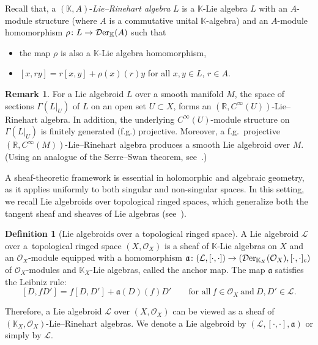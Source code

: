 \documentclass[pdftex]{sigma}
\numberwithin{equation}{section}
\theoremstyle{definition}
\newtheorem{Def}[Thm]{Definition}
\newtheorem{Rem}[Thm]{Remark}
\begin{document}
Recall that, a $(\mathbb{K}, A)$-\emph{Lie--Rinehart algebra} $L$ is a $\mathbb{K}$-Lie algebra $L$ with an $A$-module structure (where $A$ is a commutative unital $\mathbb{K}$-algebra) and an $A$-module homomorphism $\rho\colon L\rightarrow \mathcal{D}{\rm er}_{\mathbb{K}}(A)$ such that
\begin{itemize}\itemsep=0pt
	\item the map $\rho$ is also a $\mathbb{K}$-Lie algebra homomorphism,
	\item $ [x, ry]=r[x,y]+\rho(x)(r)y$ for all $x,y\in L$, $r\in A$.
\end{itemize}

\begin{Rem}
	For a Lie algebroid $L$ over a smooth manifold $M$, the space of sections $\Gamma(L|_U)$ of $L$ on an open set $U \subset X$, forms an $(\mathbb{R}, C^{\infty}(U))$-Lie--Rinehart algebra. In addition, the underlying $C^{\infty}(U)$-module structure on $\Gamma(L|_U)$ is finitely generated $($f.g.$)$ projective. Moreover, a f.g.\ projective $(\mathbb{R}, C^{\infty}(M))$-Lie--Rinehart algebra produces a smooth Lie algebroid over $M$.
(Using an analogue of the Serre--Swan theorem, see~\cite{JN}.)
\end{Rem}
A sheaf-theoretic framework is essential in holomorphic and algebraic geometry, as it applies uniformly to both singular and non-singular spaces.
In this setting, we recall Lie algebroids over topological ringed spaces, which generalize both the tangent sheaf and sheaves of Lie algebras (see~\cite{AA, JV}).

\begin{Def}[Lie algebroids over a topological ringed space] \label{Lie algebroids}
	A Lie algebroid $\mathcal{L}$ over a~topological ringed space $(X,\mathcal{O}_X)$ is a sheaf of $\mathbb{K}$-Lie algebras on $X$ and an $\mathcal{O}_X$-module equipped with a homomorphism $\mathfrak{a}\colon (\mathcal{L},[\cdot,\cdot])\rightarrow (\mathcal{D}{\rm er}_{\mathbb{K}_X}(\mathcal{O}_X),[\cdot,\cdot]_c)$ of $\mathcal{O}_X$-modules and $\mathbb{K}_X$-Lie algebras, called the anchor map. The map $\mathfrak{a}$ satisfies the Leibniz rule:
\[
[D,f D'] = f[D,D']+\mathfrak{a}(D)(f) D'\qquad \text{for all} \ f \in \mathcal{O}_X \ \text{and}
\ D,D' \in \mathcal{L}.
\]
\end{Def}	

Therefore, a Lie algebroid $\mathcal{L}$ over $(X,\mathcal{O}_X)$ can be viewed as a sheaf of $(\mathbb{K}_X, \mathcal{O}_X)$-Lie--Rinehart algebras.	We denote a Lie algebroid by $(\mathcal{L}, [\cdot, \cdot], \mathfrak{a})$ or simply by $\mathcal{L}$.
\end{document}
